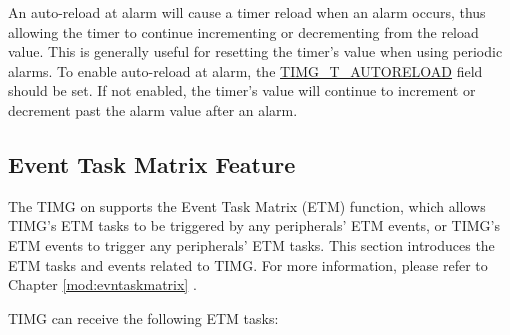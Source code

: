 \documentclass[main\_\_EN.tex]{subfiles}
\begin{document}
An auto-reload at alarm will cause a timer reload when an alarm occurs, thus allowing the timer to continue incrementing or decrementing from the reload value. This is generally useful for resetting the timer's value when using periodic alarms. To enable auto-reload at alarm, the \hyperref[fielddesc:TIMGTXAUTORELOAD]{TIMG\_T\_AUTORELOAD} field should be set. If not enabled, the timer's value will continue to increment or decrement past the alarm value after an alarm.


\subsection{Event Task Matrix Feature} \label{sec:timg-etm-func}

The TIMG on \chipname{} supports the Event Task Matrix (ETM) function, which allows TIMG's ETM tasks to be triggered by any peripherals' ETM events, or TIMG's ETM events to trigger any peripherals' ETM tasks. This section introduces the ETM tasks and events related to TIMG. For more information, please refer to Chapter \ref{mod:evntaskmatrix} .

TIMG can receive the following ETM tasks:
\end{document}

